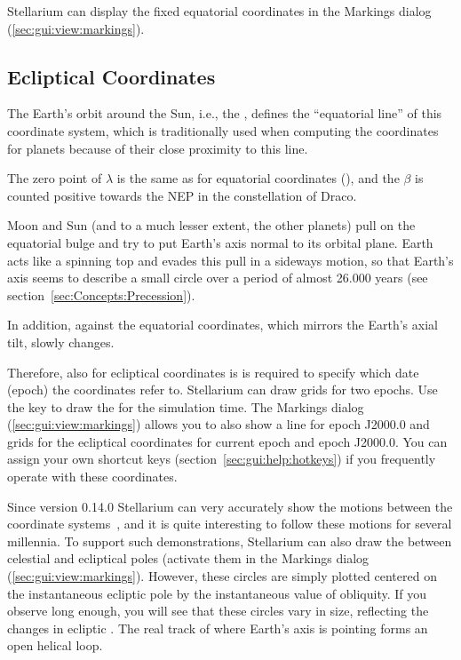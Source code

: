 Stellarium can display  the fixed equatorial
coordinates in the Markings dialog (\ref{sec:gui:view:markings}).


\subsection{Ecliptical Coordinates}
\label{sec:Concepts:Ecliptical}

The Earth's orbit around the Sun, i.e., the ,
defines the ``equatorial line'' of this coordinate system, which is traditionally used when computing the coordinates for planets because of their close proximity to this line.

The zero point of  $\lambda$ is the
same as for equatorial coordinates (\Aries), and the  $\beta$ is counted positive towards the
 NEP in the constellation of
Draco.

Moon and Sun (and to a much lesser extent, the other planets) pull on
the equatorial bulge and try to put Earth's axis normal to its orbital
plane. Earth acts like a spinning top and evades this pull in a
sideways motion, so that Earth's axis seems to describe a small circle
over a period of almost 26.000 years (see section~\ref{sec:Concepts:Precession}). 

In addition,  against the equatorial coordinates,
which mirrors the Earth's axial tilt, slowly changes.

Therefore, also for ecliptical coordinates is is required to specify
which date (epoch) the coordinates refer to.  Stellarium can draw grids
for two epochs. Use the \key{,} key to draw the 
for the simulation time. The Markings dialog
(\ref{sec:gui:view:markings}) allows you to also show a line for epoch
J2000.0 and grids for the ecliptical coordinates for current epoch and
epoch J2000.0. You can assign your own shortcut keys
(section~\ref{sec:gui:help:hotkeys}) if you frequently operate with
these coordinates.

Since version 0.14.0 Stellarium can very accurately show the motions
between the coordinate systems~\citep{2011AA:Vondrak, 2012AA:Vondrak}, and it is quite
interesting to follow these motions for several millennia. To support
such demonstrations, Stellarium can also draw the
 between celestial and ecliptical poles
(activate them in the Markings dialog (\ref{sec:gui:view:markings}).
However, these circles are simply plotted centered on the instantaneous
ecliptic pole by the instantaneous value of obliquity. 
If you observe long enough, you will
see that these circles vary in size, reflecting the changes in
ecliptic . The real track of where Earth's axis is pointing forms an open helical loop.

